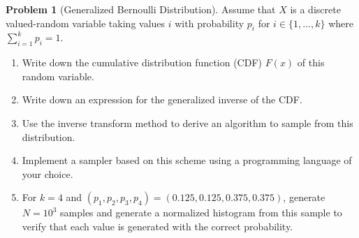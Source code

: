 \documentclass[11pt,a4paper]{article}
\theoremstyle{definition}
\newtheorem{problem}{Problem}
\theoremstyle{plain}
\begin{document}
\begin{problem}[Generalized Bernoulli Distribution]
Assume that $X$ is a discrete valued-random variable taking values $i$ with probability $p_i$ for $i \in \lbrace 1, \ldots, k \rbrace$ where $\sum_{i=1}^k p_i=1$.
\begin{enumerate}
    \item Write down the cumulative distribution function (CDF) $F(x)$ of this random variable.
\item Write down an expression for the generalized inverse of the CDF.
\item Use the inverse transform method to derive an algorithm to sample from this distribution.
\item Implement a sampler based on this scheme using a programming language of your choice.
\item   For $k=4$ and $(p_1, p_2, p_3, p_4) = (0.125, 0.125, 0.375, 0.375)$,
    generate $N = 10^3$ samples and generate a normalized histogram from this sample to verify that each value is generated with the correct probability.
\end{enumerate}
\end{problem}
\end{document}
